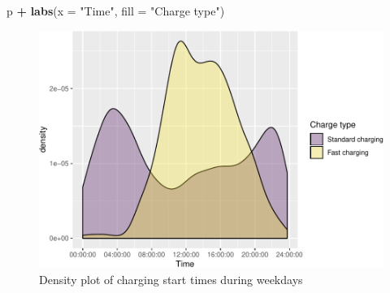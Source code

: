 \documentclass[]{article}
\newenvironment{Shaded}{\begin{snugshade}}{\end{snugshade}}
\newcommand{\KeywordTok}[1]{\textcolor[rgb]{0.13,0.29,0.53}{\textbf{#1}}}
\newcommand{\DataTypeTok}[1]{\textcolor[rgb]{0.13,0.29,0.53}{#1}}
\newcommand{\FloatTok}[1]{\textcolor[rgb]{0.00,0.00,0.81}{#1}}
\newcommand{\StringTok}[1]{\textcolor[rgb]{0.31,0.60,0.02}{#1}}
\newcommand{\OperatorTok}[1]{\textcolor[rgb]{0.81,0.36,0.00}{\textbf{#1}}}
\newcommand{\NormalTok}[1]{#1}
\begin{document}
\begin{Shaded}
\begin{Highlighting}[]
\NormalTok{p }\OperatorTok{+}\StringTok{ }\KeywordTok{labs}\NormalTok{(}\DataTypeTok{x =} \StringTok{"Time"}\NormalTok{, }\DataTypeTok{fill =} \StringTok{"Charge type"}\NormalTok{)}
\end{Highlighting}
\end{Shaded}

\begin{figure}
\centering
\includegraphics{EVBB_SummaryReport_files/figure-latex/chargeBeginsWeekday-1.pdf}
\caption{\label{fig:chargeBeginsWeekday}Density plot of charging start times
during weekdays}
\end{figure}

\begin{Shaded}
\end{Shaded}
\end{document}
